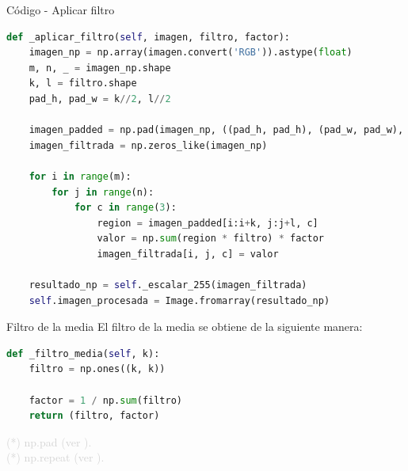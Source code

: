 \documentclass{beamer}
\begin{document}
\begin{frame}[fragile]{Código - Aplicar filtro}
	\justifying
	
	\begin{lstlisting}[language=Python]
def _aplicar_filtro(self, imagen, filtro, factor):
	imagen_np = np.array(imagen.convert('RGB')).astype(float)
	m, n, _ = imagen_np.shape
	k, l = filtro.shape
	pad_h, pad_w = k//2, l//2
	
	imagen_padded = np.pad(imagen_np, ((pad_h, pad_h), (pad_w, pad_w), (0, 0)), mode='constant')
	imagen_filtrada = np.zeros_like(imagen_np)
	
	for i in range(m):
		for j in range(n):
			for c in range(3):
				region = imagen_padded[i:i+k, j:j+l, c]
				valor = np.sum(region * filtro) * factor
				imagen_filtrada[i, j, c] = valor
	
	resultado_np = self._escalar_255(imagen_filtrada)
	self.imagen_procesada = Image.fromarray(resultado_np)
	\end{lstlisting}
\end{frame}

\begin{frame}[fragile]{Filtro de la media}
	\justifying
	El filtro de la media se obtiene de la siguiente manera:
	
	\begin{lstlisting}[language=Python]
def _filtro_media(self, k):
	filtro = np.ones((k, k))
	
	factor = 1 / np.sum(filtro)
	return (filtro, factor)
	\end{lstlisting}
	
	\vfill
	\footnotesize \textcolor{lightgray}{(*) np.pad (ver \cite{numpy.pad}).}\\
	\footnotesize \textcolor{lightgray}{(*) np.repeat (ver \cite{numpy.repeat}).}
\end{frame}
\end{document}
